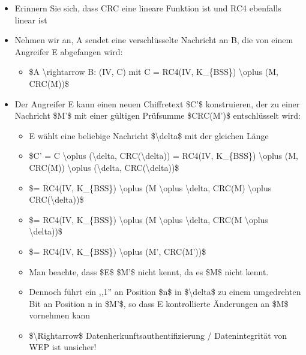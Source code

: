\documentclass[a4paper]{article}
\begin{document}
\begin{multicols}{3}
    \begin{itemize}
        \item
              Erinnern Sie sich, dass CRC eine lineare Funktion ist und RC4
              ebenfalls linear ist
        \item
              Nehmen wir an, A sendet eine verschlüsselte Nachricht an B, die von
              einem Angreifer E abgefangen wird:

              \begin{itemize}
                  \item
                        \$A \textbackslash rightarrow B: (IV, C) mit C = RC4(IV, K\_\{BSS\})
                        \textbackslash oplus (M, CRC(M))\$
              \end{itemize}
        \item
              Der Angreifer E kann einen neuen Chiffretext \$C'\$ konstruieren, der
              zu einer Nachricht \$M'\$ mit einer gültigen Prüfsumme \$CRC(M')\$
              entschlüsselt wird:

              \begin{itemize}
                  \item
                        E wählt eine beliebige Nachricht \$\textbackslash delta\$ mit der
                        gleichen Länge
                  \item
                        \$C' = C \textbackslash oplus (\textbackslash delta,
                        CRC(\textbackslash delta)) = RC4(IV, K\_\{BSS\})
                        \textbackslash oplus (M, CRC(M)) \textbackslash oplus
                        (\textbackslash delta, CRC(\textbackslash delta))\$
                  \item
                        \$= RC4(IV, K\_\{BSS\}) \textbackslash oplus (M \textbackslash oplus
                        \textbackslash delta, CRC(M) \textbackslash oplus
                        CRC(\textbackslash delta))\$
                  \item
                        \$= RC4(IV, K\_\{BSS\}) \textbackslash oplus (M \textbackslash oplus
                        \textbackslash delta, CRC(M \textbackslash oplus
                        \textbackslash delta))\$
                  \item
                        \$= RC4(IV, K\_\{BSS\}) \textbackslash oplus (M', CRC(M'))\$
                  \item
                        Man beachte, dass \$E\$ \$M'\$ nicht kennt, da es \$M\$ nicht kennt.
                  \item
                        Dennoch führt ein ,,1'' an Position \$n\$ in
                        \$\textbackslash delta\$ zu einem umgedrehten Bit an Position n in
                        \$M'\$, so dass E kontrollierte Änderungen an \$M\$ vornehmen kann
                  \item
                        \$\textbackslash Rightarrow\$ Datenherkunftsauthentifizierung /
                        Datenintegrität von WEP ist unsicher!
              \end{itemize}
    \end{itemize}



\end{multicols}
\end{document}
